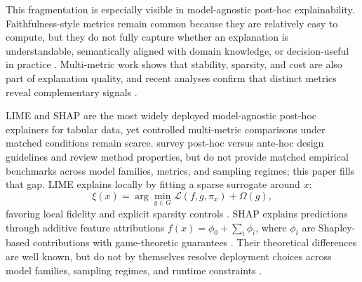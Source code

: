 \documentclass[twoside,11pt]{article}
\begin{document}
\begin{sloppypar}
This fragmentation is especially visible in model-agnostic post-hoc
explainability. Faithfulness-style metrics remain common because they are
relatively easy to compute, but they do not fully capture whether an
explanation is understandable, semantically aligned with domain knowledge,
or decision-useful in practice
\citep{ali2023trustworthy,longo2024manifesto}.
Multi-metric work shows that stability, sparsity, and cost are also
part of explanation quality, and recent analyses confirm that distinct
metrics reveal complementary signals \citep{pawlicki2024metrics,zheng2025ffidelity}.
\end{sloppypar}

LIME and SHAP are the most widely deployed model-agnostic post-hoc
explainers for tabular data, yet controlled multi-metric comparisons
under matched conditions remain scarce. \citet{retzlaff2024posthoc} survey post-hoc versus ante-hoc design
guidelines and review method properties, but do not provide matched
empirical benchmarks across model families, metrics, and sampling regimes;
this paper fills that gap. LIME explains locally by
fitting a sparse surrogate around $x$:
\[
\xi(x) = \arg\min_{g \in G} \mathcal{L}(f, g, \pi_x) + \Omega(g),
\]
favoring local fidelity and explicit sparsity controls
\citep{ribeiro2016why}. SHAP explains predictions through additive
feature attributions $f(x) = \phi_0 + \sum_i \phi_i$, where $\phi_i$
are Shapley-based contributions with game-theoretic guarantees
\citep{lundberg2017unified}. Their theoretical differences are well
known, but do not by themselves resolve deployment choices across model
families, sampling regimes, and runtime constraints
\citep{retzlaff2024posthoc,ali2023trustworthy}.
\end{document}
